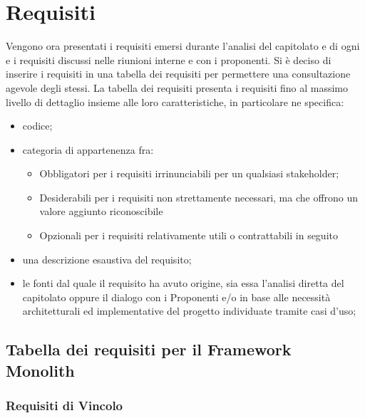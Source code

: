 \section{Requisiti}
Vengono ora presentati i requisiti emersi durante l’analisi del capitolato e di ogni  e i requisiti discussi nelle riunioni interne e con i proponenti.
Si è deciso di inserire i requisiti in una tabella dei requisiti per permettere una consultazione agevole degli stessi.
La tabella dei requisiti presenta i requisiti fino al massimo livello di dettaglio insieme alle loro caratteristiche, in particolare ne specifica:
\begin{itemize}
	\item codice;
	\item categoria di appartenenza fra:
	\begin{itemize}
		\item Obbligatori per i requisiti irrinunciabili per un qualsiasi stakeholder;
		\item Desiderabili per i requisiti non strettamente necessari, ma che offrono un valore aggiunto riconoscibile
		\item Opzionali per i requisiti relativamente utili o contrattabili in seguito
	\end{itemize}
	\item una descrizione esaustiva del requisito;
	\item le fonti dal quale il requisito ha avuto origine, sia essa l’analisi diretta del capitolato oppure il dialogo con i Proponenti e/o in base alle necessità architetturali ed implementative del progetto individuate tramite casi d'uso;	
\end{itemize}

\subsection{Tabella dei requisiti per il Framework Monolith}

\subsubsection{Requisiti di Vincolo}

